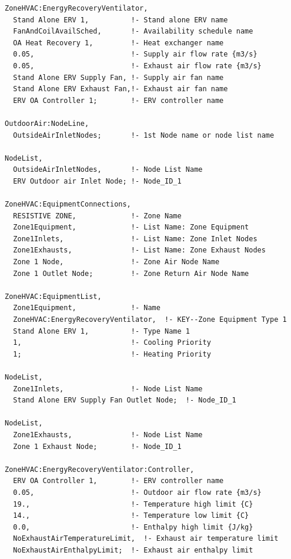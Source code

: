 \begin{lstlisting}
ZoneHVAC:EnergyRecoveryVentilator,
  Stand Alone ERV 1,          !- Stand alone ERV name
  FanAndCoilAvailSched,       !- Availability schedule name
  OA Heat Recovery 1,         !- Heat exchanger name
  0.05,                       !- Supply air flow rate {m3/s}
  0.05,                       !- Exhaust air flow rate {m3/s}
  Stand Alone ERV Supply Fan, !- Supply air fan name
  Stand Alone ERV Exhaust Fan,!- Exhaust air fan name
  ERV OA Controller 1;        !- ERV controller name

OutdoorAir:NodeLine,
  OutsideAirInletNodes;       !- 1st Node name or node list name

NodeList,
  OutsideAirInletNodes,       !- Node List Name
  ERV Outdoor air Inlet Node; !- Node_ID_1

ZoneHVAC:EquipmentConnections,
  RESISTIVE ZONE,             !- Zone Name
  Zone1Equipment,             !- List Name: Zone Equipment
  Zone1Inlets,                !- List Name: Zone Inlet Nodes
  Zone1Exhausts,              !- List Name: Zone Exhaust Nodes
  Zone 1 Node,                !- Zone Air Node Name
  Zone 1 Outlet Node;         !- Zone Return Air Node Name

ZoneHVAC:EquipmentList,
  Zone1Equipment,             !- Name
  ZoneHVAC:EnergyRecoveryVentilator,  !- KEY--Zone Equipment Type 1
  Stand Alone ERV 1,          !- Type Name 1
  1,                          !- Cooling Priority
  1;                          !- Heating Priority

NodeList,
  Zone1Inlets,                !- Node List Name
  Stand Alone ERV Supply Fan Outlet Node;  !- Node_ID_1

NodeList,
  Zone1Exhausts,              !- Node List Name
  Zone 1 Exhaust Node;        !- Node_ID_1

ZoneHVAC:EnergyRecoveryVentilator:Controller,
  ERV OA Controller 1,        !- ERV controller name
  0.05,                       !- Outdoor air flow rate {m3/s}
  19.,                        !- Temperature high limit {C}
  14.,                        !- Temperature low limit {C}
  0.0,                        !- Enthalpy high limit {J/kg}
  NoExhaustAirTemperatureLimit,  !- Exhaust air temperature limit
  NoExhaustAirEnthalpyLimit;  !- Exhaust air enthalpy limit


\end{lstlisting}

